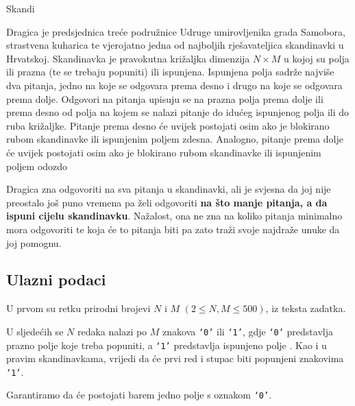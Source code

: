 \begin{statement}[
  problempoints=110,
  timelimit=1 sekunda,
  memorylimit=512 MiB,
]{Skandi}


Dragica je predsjednica treće podružnice Udruge umirovljenika grada Samobora,
strastvena kuharica te vjerojatno jedna od najboljih rješavateljica
skandinavki u Hrvatskoj. Skandinavka je pravokutna križaljka dimenzija $N
\times M$ u kojoj su polja ili prazna (te se trebaju popuniti) ili ispunjena.
Ispunjena polja sadrže najviše dva pitanja, jedno na koje se odgovara prema
desno i drugo na koje se odgovara prema dolje. Odgovori na pitanja upisuju se
na prazna polja prema dolje ili prema desno od polja na kojem se nalazi
pitanje do idućeg ispunjenog polja ili do ruba križaljke.  Pitanje prema
desno će uvijek postojati osim ako je blokirano rubom skandinavke ili
ispunjenim poljem zdesna. Analogno, pitanje prema dolje će uvijek postojati
osim ako je blokirano rubom skandinavke ili ispunjenim poljem odozdo

Dragica zna odgovoriti na sva pitanja u skandinavki, ali je svjesna da joj nije
preostalo još puno vremena pa želi odgovoriti \textbf{na što manje pitanja, a
da ispuni cijelu skandinavku}. Nažalost, ona ne zna na koliko pitanja
minimalno mora odgovoriti te koja će to pitanja biti pa zato traži svoje
najdraže unuke da joj pomognu.

\subsection*{Ulazni podaci}
U prvom su retku prirodni brojevi $N$ i $M$ $(2 \le N, M \le 500)$, iz teksta
zadatka.

U sljedećih se $N$ redaka nalazi po $M$ znakova \texttt{‘0’} ili
\texttt{‘1’}, gdje \texttt{‘0’} predstavlja prazno polje koje treba popuniti,
a \texttt{‘1’} predstavlja ispunjeno polje . Kao i u pravim skandinavkama,
vrijedi da će prvi red i stupac biti popunjeni znakovima \texttt{‘1’}.

Garantiramo da će postojati barem jedno polje s oznakom \texttt{‘0’}.


\end{statement}
